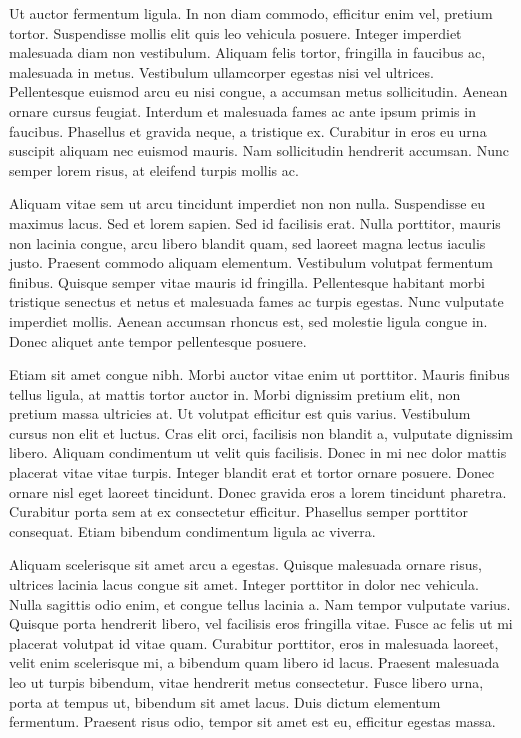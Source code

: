 \documentclass[10pt, a4paper]{article}
\theoremstyle{theorem-style}
\theoremstyle{definition-style}
\theoremstyle{remark-style}
\theoremstyle{example-style}
\theoremstyle{definition-style}
\theoremstyle{remark-style}
\begin{document}
Ut auctor fermentum ligula. In non diam commodo, efficitur enim vel, pretium tortor. Suspendisse mollis elit quis leo vehicula posuere. Integer imperdiet malesuada diam non vestibulum. Aliquam felis tortor, fringilla in faucibus ac, malesuada in metus. Vestibulum ullamcorper egestas nisi vel ultrices. Pellentesque euismod arcu eu nisi congue, a accumsan metus sollicitudin. Aenean ornare cursus feugiat. Interdum et malesuada fames ac ante ipsum primis in faucibus. Phasellus et gravida neque, a tristique ex. Curabitur in eros eu urna suscipit aliquam nec euismod mauris. Nam sollicitudin hendrerit accumsan. Nunc semper lorem risus, at eleifend turpis mollis ac.

Aliquam vitae sem ut arcu tincidunt imperdiet non non nulla. Suspendisse eu maximus lacus. Sed et lorem sapien. Sed id facilisis erat. Nulla porttitor, mauris non lacinia congue, arcu libero blandit quam, sed laoreet magna lectus iaculis justo. Praesent commodo aliquam elementum. Vestibulum volutpat fermentum finibus. Quisque semper vitae mauris id fringilla. Pellentesque habitant morbi tristique senectus et netus et malesuada fames ac turpis egestas. Nunc vulputate imperdiet mollis. Aenean accumsan rhoncus est, sed molestie ligula congue in. Donec aliquet ante tempor pellentesque posuere.

Etiam sit amet congue nibh. Morbi auctor vitae enim ut porttitor. Mauris finibus tellus ligula, at mattis tortor auctor in. Morbi dignissim pretium elit, non pretium massa ultricies at. Ut volutpat efficitur est quis varius. Vestibulum cursus non elit et luctus. Cras elit orci, facilisis non blandit a, vulputate dignissim libero. Aliquam condimentum ut velit quis facilisis. Donec in mi nec dolor mattis placerat vitae vitae turpis. Integer blandit erat et tortor ornare posuere. Donec ornare nisl eget laoreet tincidunt. Donec gravida eros a lorem tincidunt pharetra. Curabitur porta sem at ex consectetur efficitur. Phasellus semper porttitor consequat. Etiam bibendum condimentum ligula ac viverra.

Aliquam scelerisque sit amet arcu a egestas. Quisque malesuada ornare risus, ultrices lacinia lacus congue sit amet. Integer porttitor in dolor nec vehicula. Nulla sagittis odio enim, et congue tellus lacinia a. Nam tempor vulputate varius. Quisque porta hendrerit libero, vel facilisis eros fringilla vitae. Fusce ac felis ut mi placerat volutpat id vitae quam. Curabitur porttitor, eros in malesuada laoreet, velit enim scelerisque mi, a bibendum quam libero id lacus. Praesent malesuada leo ut turpis bibendum, vitae hendrerit metus consectetur. Fusce libero urna, porta at tempus ut, bibendum sit amet lacus. Duis dictum elementum fermentum. Praesent risus odio, tempor sit amet est eu, efficitur egestas massa.
\end{document}
